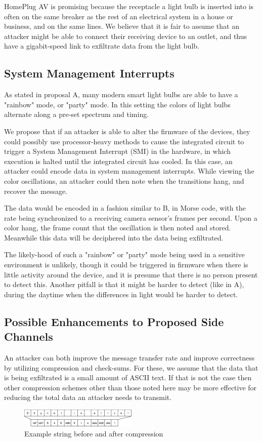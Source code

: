\documentclass[conference]{IEEEtran}
\begin{document}
HomePlug AV is promising because the receptacle a light bulb is inserted into is often on the same breaker as the rest of an electrical system in a house or business, and on the same lines. We believe that it is fair to assume that an attacker might be able to connect their receiving device to an outlet, and thus have a gigabit-speed link to exfiltrate data from the light bulb. 

\subsection{System Management Interrupts}
As stated in proposal A, many modern smart light bulbs are able to have a "rainbow" mode, or "party" mode. In this setting the colors of light bulbs alternate along a pre-set spectrum and timing.

We propose that if an attacker is able to alter the firmware of the devices, they could possibly use processor-heavy methods to cause the integrated circuit to trigger a System Management Interrupt (SMI) in the hardware, in which execution is halted until the integrated circuit has cooled. In this case, an attacker could encode data in system management interrupts. While viewing the color oscillations, an attacker could then note when the transitions hang, and recover the message.

The data would be encoded in a fashion similar to B, in Morse code, with the rate being synchronized to a receiving camera sensor's frames per second.  Upon a color hang, the frame count that the oscillation is then noted and stored. Meanwhile this data will be deciphered into the data being exfiltrated.

The likely-hood of such a "rainbow" or "party" mode being used in a sensitive environment is unlikely, though it could be triggered in firmware when there is little activity around the device, and it is presume that there is no person present to detect this. Another pitfall is that it might be harder to detect (like in A), during the daytime when the differences in light would be harder to detect.

\subsection{Possible Enhancements to Proposed Side Channels}
An attacker can both improve the message transfer rate and improve correctness by utilizing compression and check-sums. For these, we assume that the data that is being exfiltrated is a small amount of ASCII text. If that is not the case then other compression schemes other than those noted here may be more effective for reducing the total data an attacker needs to transmit.
\begin{figure}
    \centering
    \includegraphics[width=0.5\textwidth]{text_compression_smaz.png}
    \caption{Example string before and after compression}
\end{figure}
\end{document}
